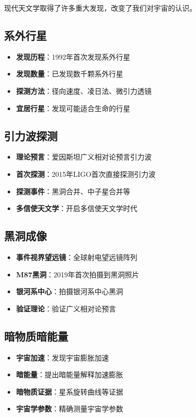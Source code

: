 \documentclass[12pt,UTF8]{ctexbook}
\begin{document}
现代天文学取得了许多重大发现，改变了我们对宇宙的认识。

\subsection{系外行星}

\begin{itemize}
  \item \textbf{发现历程}：1992年首次发现系外行星
  \item \textbf{发现数量}：已发现数千颗系外行星
  \item \textbf{探测方法}：径向速度、凌日法、微引力透镜
  \item \textbf{宜居行星}：发现可能适合生命的行星
\end{itemize}

\subsection{引力波探测}

\begin{itemize}
  \item \textbf{理论预言}：爱因斯坦广义相对论预言引力波
  \item \textbf{首次探测}：2015年LIGO首次直接探测引力波
  \item \textbf{探测事件}：黑洞合并、中子星合并等
  \item \textbf{多信使天文学}：开启多信使天文学时代
\end{itemize}

\subsection{黑洞成像}

\begin{itemize}
  \item \textbf{事件视界望远镜}：全球射电望远镜阵列
  \item \textbf{M87黑洞}：2019年首次拍摄到黑洞照片
  \item \textbf{银河系中心}：拍摄银河系中心黑洞
  \item \textbf{验证理论}：验证广义相对论预言
\end{itemize}

\subsection{暗物质暗能量}

\begin{itemize}
  \item \textbf{宇宙加速}：发现宇宙膨胀加速
  \item \textbf{暗能量}：提出暗能量解释加速膨胀
  \item \textbf{暗物质证据}：星系旋转曲线等证据
  \item \textbf{宇宙学参数}：精确测量宇宙学参数
\end{itemize}
\end{document}
